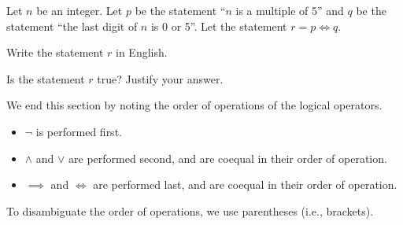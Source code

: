 \newpage

\begin{exercise}
    Let $n$ be an integer. Let $p$ be the statement ``$n$ is a multiple of 5'' and $q$ be the statement ``the last digit of $n$ is 0 or 5''. Let the statement $r = p \iff q$.
    \begin{partquestions}{\roman*}
        \item Write the statement $r$ in English.
        \item Is the statement $r$ true? Justify your answer.
    \end{partquestions}
\end{exercise}

We end this section by noting the order of operations of the logical operators.
\begin{itemize}
    \item $\lnot$ is performed first.
    \item $\land$ and $\lor$ are performed second, and are coequal in their order of operation.
    \item $\implies$ and $\iff$ are performed last, and are coequal in their order of operation.
\end{itemize}
To disambiguate the order of operations, we use parentheses (i.e., brackets).

